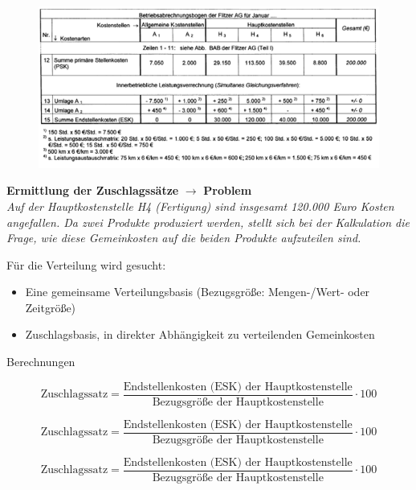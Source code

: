 \documentclass[a4paper,11pt, twoside]{article}
\begin{document}
\begin{figure}[h]
 \begin{center}
   \includegraphics[scale=0.5]{bilder/leistungsverechnung2.png}
 \end{center}
\end{figure}
\newpage 

\textbf{Ermittlung der Zuschlagssätze} $\rightarrow$ \textbf{Problem}\\
\textit{Auf der Hauptkostenstelle H4 (Fertigung) sind insgesamt 120.000 Euro Kosten angefallen. Da zwei Produkte produziert werden, stellt sich bei der Kalkulation die Frage, wie diese Gemeinkosten auf die beiden Produkte aufzuteilen sind.}

Für die Verteilung wird gesucht:
\begin{itemize}
	\item Eine gemeinsame Verteilungsbasis (Bezugsgröße: Mengen-/Wert- oder Zeitgröße)
	\item Zuschlagsbasis, in direkter Abhängigkeit zu verteilenden Gemeinkosten
\end{itemize}  

Berechnungen

\begin{equation}
\text{Zuschlagssatz} = \frac{\text{Endstellenkosten (ESK) der Hauptkostenstelle}}{\text{Bezugsgröße der Hauptkostenstelle}} \cdot 100
\end{equation}

\begin{equation}
\text{Zuschlagssatz} = \frac{\text{Endstellenkosten (ESK) der Hauptkostenstelle}}{\text{Bezugsgröße der Hauptkostenstelle}} \cdot 100
\end{equation}

\begin{equation}
\text{Zuschlagssatz} = \frac{\text{Endstellenkosten (ESK) der Hauptkostenstelle}}{\text{Bezugsgröße der Hauptkostenstelle}} \cdot 100
\end{equation}
\end{document}
